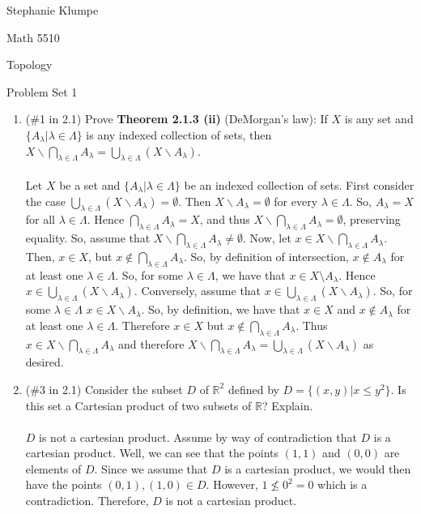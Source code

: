 \documentclass[12pt]{article}
\begin{document}
\noindent Stephanie Klumpe

\noindent Math 5510

\noindent Topology

\vspace{.2in}
\begin{center}
Problem Set 1
\end{center}

 \begin{enumerate}
\item (\#1 in 2.1) Prove \textbf{Theorem 2.1.3 (ii)} (DeMorgan's law): If $X$ is any set and $\{A_{\lambda}|\lambda\in\Lambda\}$ is any indexed collection of sets, then $X\backslash \bigcap_{\lambda\in\Lambda} A_{\lambda} = \bigcup_{\lambda\in\Lambda}(X\backslash A_{\lambda})$.\\\\
Let $X$ be a set and $\{A_{\lambda}|\lambda\in\Lambda\}$ be an indexed collection of sets. First consider the case $\bigcup_{\lambda\in\Lambda}(X\backslash A_{\lambda})=\emptyset$. Then $X\backslash A_{\lambda}=\emptyset$ for every $\lambda\in\Lambda$. So, $A_{\lambda}=X$ for all $\lambda\in\Lambda$. Hence $\bigcap_{\lambda\in\Lambda}A_{\lambda}=X$, and thus $X\backslash \bigcap_{\lambda\in\Lambda} A_{\lambda} =\emptyset$, preserving equality. So, assume that $X\backslash \bigcap_{\lambda\in\Lambda} A_{\lambda}\neq\emptyset$. Now, let $x\in X\backslash \bigcap_{\lambda\in\Lambda} A_{\lambda}$. Then, $x\in X$, but $x\notin\bigcap_{\lambda\in\Lambda} A_{\lambda}$. So, by definition of intersection, $x\notin A_{\lambda}$ for at least one $\lambda\in\Lambda$. So, for some $\lambda\in\Lambda$, we have that $x\in X\setminus A_{\lambda}$. Hence $x\in\bigcup_{\lambda\in\Lambda}(X\backslash A_{\lambda})$. Conversely, assume that $x\in\bigcup_{\lambda\in\Lambda}(X\backslash A_{\lambda})$. So, for some $\lambda\in\Lambda$ $x\in X\backslash A_{\lambda}$. So, by definition, we have that $x\in X$ and $x\notin A_{\lambda}$ for at least one $\lambda\in\Lambda$. Therefore $x\in X$ but $x\notin\bigcap_{\lambda\in\Lambda} A_{\lambda}$. Thus $x\in X\backslash \bigcap_{\lambda\in\Lambda} A_{\lambda}$ and therefore $X\backslash \bigcap_{\lambda\in\Lambda} A_{\lambda} = \bigcup_{\lambda\in\Lambda}(X\backslash A_{\lambda})$ as desired.\\[20pt]


\item (\#3 in 2.1) Consider the subset $D$ of $\mathbb{R}^2$ defined by $D=\{(x,y)|x\leq y^2\}$. Is this set a Cartesian product of two subsets of $\mathbb{R}$? Explain.\\\\
$D$ is not a cartesian product. Assume by way of contradiction that $D$ is a cartesian product. Well, we can see that the points $(1,1)$ and $(0,0)$ are elements of $D$. Since we assume that $D$ is a cartesian product, we would then have the points $(0,1),(1,0)\in D$. However, $1\nleq 0^2=0$ which is a contradiction. Therefore, $D$ is not a cartesian product.\\[20pt]



\end{enumerate}
\end{document}
